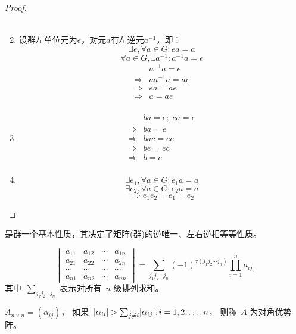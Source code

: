 \documentclass[twoside,openright]{book}
\begin{document}
\begin{CJK*}{UTF8}{}
\begin{proof}
\begin{enumerate}
\[\begin{split}
\end{split}
\]
\item
设群左单位元为$e$，对元$a$有左逆元$a^{-1}$，即：
\[
\exists e, \forall a \in G: e a = a
\]
\[
\forall a \in G, \exists a^{-1}: a^{-1} a = e
\]
\[
\begin{split}
& a^{-1} a = e \\
\Rightarrow & a a^{-1} a = a e \\
\Rightarrow & e a = a e \\
\Rightarrow & a = a e \\
\end{split}
\]
\item
\[
\begin{split}
& b a = e;\; c a = e \\
\Rightarrow & b a = e \\
\Rightarrow & b a c = e c \\
\Rightarrow & b e = e c \\
\Rightarrow & b = c \\
\end{split}
\]
\item
\[
\exists e_1, \forall a \in G: e_1 a = a
\]
\[
\exists e_2, \forall a \in G: e_2 a = a
\]
\[
\Rightarrow e_1 e_2 = e_1 = e_2
\]
\end{enumerate}
\end{proof}

\begin{rem}
{}是群一个基本性质，其决定了矩阵(群)的逆唯一、左右逆相等等性质。
\end{rem}

\begin{lem}
\[
\begin{vmatrix}
a_{11} & a_{12} & \dotsm & a_{1n} \\
a_{21} & a_{22} & \dotsm & a_{2n} \\
\dotsm & \dotsm & \dotsm & \dotsm \\
a_{n1} & a_{n2} & \dotsm & a_{nn}
\end{vmatrix}
=
\sum_{j_1 j_2 \dotsm j_n}
(-1)^{\tau(j_1 j_2 \dotsm j_n)}
\prod^n_{i=1}a_{ij_i}
\]
其中\ $\sum_{j_1 j_2 \dotsm j_n}$ 表示对所有\ $n$ 级排列求和。
\end{lem}

\begin{defn}
$A_{n\times n}=(\alpha_{ij})$，
如果\ $\lvert{\alpha_{ii}}\rvert>\sum_{j\neq i}\lvert{\alpha_{ij}}\rvert,i=1,2,\dotsc,n$，
则称\ $A$ 为对角优势阵。
\end{defn}


\end{CJK*}
\end{document}
